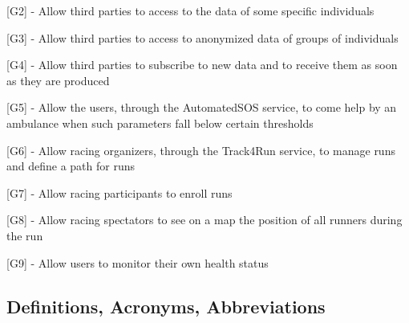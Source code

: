\hspace{-\parindent}[G2] - Allow third parties to access to the data of some specific individuals\newline

\hspace{-\parindent}[G3] - Allow third parties to access to anonymized data of groups of individuals\newline

\hspace{-\parindent}[G4] - Allow third parties to subscribe to new data and to receive them as soon as they are produced\newline

\hspace{-\parindent}[G5] - Allow the users, through the AutomatedSOS service, to come help by an ambulance when such parameters fall below certain thresholds\newline

\hspace{-\parindent}[G6] - Allow racing organizers, through the Track4Run service, to manage runs and define a path for runs\newline

\hspace{-\parindent}[G7] - Allow racing participants to enroll runs\newline

\hspace{-\parindent}[G8] - Allow racing spectators to see on a map the position of all runners during the run\newline

\hspace{-\parindent}[G9] - Allow users to monitor their own health status

\subsection{Definitions, Acronyms, Abbreviations}
